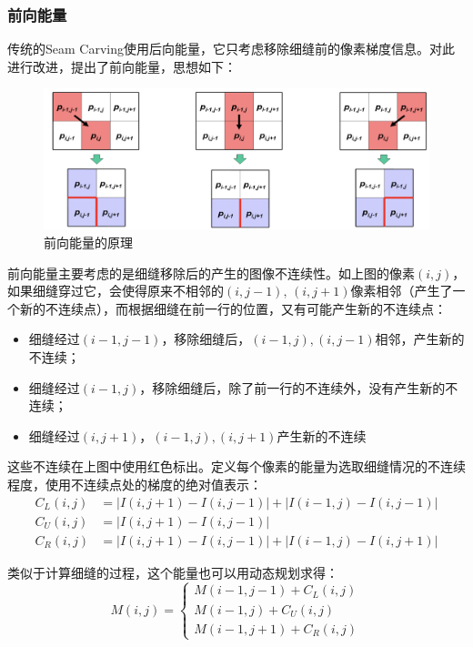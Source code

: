 \documentclass[twoside,a4paper,4pt]{article}
\begin{document}
\subsubsection{前向能量}
传统的Seam Carving使用后向能量，它只考虑移除细缝前的像素梯度信息。\cite{rubinstein2008improved}对此进行改进，提出了前向能量，思想如下：
\begin{figure}[H]
    \centering
    \includegraphics[width=0.8\linewidth]{demo/fw_energy.png}
    \caption{前向能量的原理}
    \label{fig:fw_energy_inner}
\end{figure}\par
前向能量主要考虑的是细缝移除后的产生的图像不连续性。如上图的像素$(i,j)$，如果细缝穿过它，会使得原来不相邻的$(i,j-1),\,(i,j+1)$像素相邻（产生了一个新的不连续点），而根据细缝在前一行的位置，又有可能产生新的不连续点：
\begin{itemize}
    \item 细缝经过$(i-1,j-1)$，移除细缝后，$(i-1,j),(i,j-1)$相邻，产生新的不连续；
    \item 细缝经过$(i-1,j)$，移除细缝后，除了前一行的不连续外，没有产生新的不连续；
    \item 细缝经过$(i,j+1)$，$(i-1,j),(i,j+1)$产生新的不连续
\end{itemize}\par
这些不连续在上图中使用红色标出。定义每个像素的能量为选取细缝情况的不连续程度，使用不连续点处的梯度的绝对值表示：
\begin{equation}
    \begin{split}
        C_L(i,j) &= |I(i,j+1)-I(i,j-1)| + |I(i-1,j)-I(i,j-1)|\\
        C_U(i,j) &= |I(i,j+1)-I(i,j-1)| \\
        C_R(i,j) &= |I(i,j+1)-I(i,j-1)| + |I(i-1,j)-I(i,j+1)|
    \end{split}
\end{equation}\par
类似于计算细缝的过程，这个能量也可以用动态规划求得：
\begin{equation}
    M(i,j) = 
    \begin{cases}
        M(i-1,j-1) + C_L(i,j) \\
        M(i-1,j) + C_U(i,j) \\
        M(i-1,j+1) + C_R(i,j)
    \end{cases}
\end{equation}\par
\end{document}
